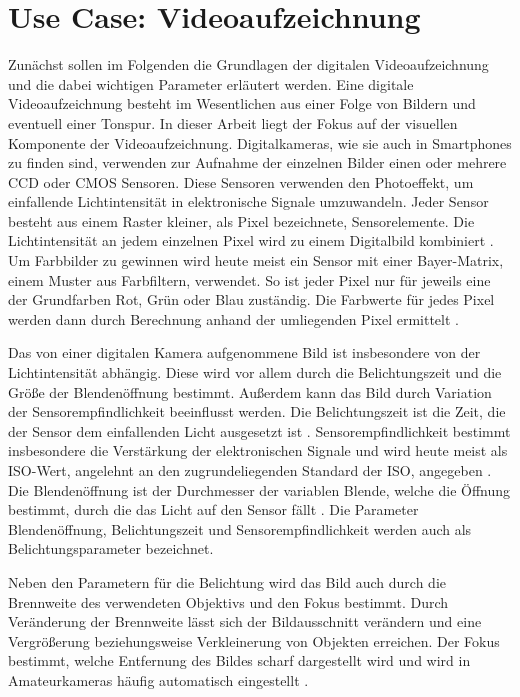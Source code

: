 \section{Use Case: Videoaufzeichnung}
\label{sec:Videoaufzeichnung}

Zunächst sollen im Folgenden die Grundlagen der digitalen Videoaufzeichnung und die dabei wichtigen Parameter erläutert werden.
Eine digitale Videoaufzeichnung besteht im Wesentlichen aus einer Folge von Bildern und eventuell einer Tonspur.
In dieser Arbeit liegt der Fokus auf der visuellen Komponente der Videoaufzeichnung.
Digitalkameras, wie sie auch in Smartphones zu finden sind, verwenden zur Aufnahme der einzelnen Bilder einen oder mehrere \ac{CCD} oder \ac{CMOS} Sensoren.
Diese Sensoren verwenden den Photoeffekt, um einfallende Lichtintensität in elektronische Signale umzuwandeln.
Jeder Sensor besteht aus einem Raster kleiner, als Pixel bezeichnete, Sensorelemente.
Die Lichtintensität an jedem einzelnen Pixel wird zu einem Digitalbild kombiniert \cite[S. 63ff.]{Szeliski_ComputerVision}.
Um Farbbilder zu gewinnen wird heute meist ein Sensor mit einer Bayer-Matrix, einem Muster aus Farbfiltern, verwendet.
So ist jeder Pixel nur für jeweils eine der Grundfarben Rot, Grün oder Blau zuständig.
Die Farbwerte für jedes Pixel werden dann durch Berechnung anhand der umliegenden Pixel ermittelt \cite[S. 420ff.]{Schmidt_Videotechnik}.

Das von einer digitalen Kamera aufgenommene Bild ist insbesondere von der Lichtintensität abhängig.
Diese wird vor allem durch die Belichtungszeit und die Größe der Blendenöffnung bestimmt.
Außerdem kann das Bild durch Variation der Sensorempfindlichkeit beeinflusst werden.
Die Belichtungszeit ist die Zeit, die der Sensor dem einfallenden Licht ausgesetzt ist \cite[S. 390ff.]{Schmidt_Videotechnik}.
Sensorempfindlichkeit bestimmt insbesondere die Verstärkung der elektronischen Signale und wird heute meist als \acs{ISO}-Wert, angelehnt an den zugrundeliegenden Standard der \acf{ISO}, angegeben \cite[S. 412ff.]{Schmidt_Videotechnik}.
Die Blendenöffnung ist der Durchmesser der variablen Blende, welche die Öffnung bestimmt, durch die das Licht auf den Sensor fällt \cite[S. 444ff.]{Schmidt_Videotechnik}.
Die Parameter Blendenöffnung, Belichtungszeit und Sensorempfindlichkeit werden auch als Belichtungsparameter bezeichnet.

Neben den Parametern für die Belichtung wird das Bild auch durch die Brennweite des verwendeten Objektivs und den Fokus bestimmt.
Durch Veränderung der Brennweite lässt sich der Bildausschnitt verändern und eine Vergrößerung beziehungsweise Verkleinerung von Objekten erreichen.
Der Fokus bestimmt, welche Entfernung des Bildes scharf dargestellt wird und wird in Amateurkameras häufig automatisch eingestellt \cite[S. 445ff.]{Schmidt_Videotechnik}.




